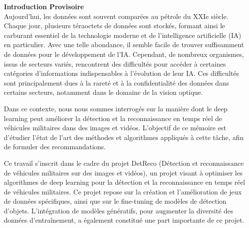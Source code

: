 \sloppy

\textbf{Introduction Provisoire}\\

Aujourd'hui, les données sont souvent comparées au pétrole du XXIe siècle. 
Chaque jour, plusieurs téraoctets de données sont stockés, formant ainsi le carburant essentiel de la technologie moderne et de l'intelligence artificielle (IA) en particulier.
Avec une telle abondance, il semble facile de trouver suffisamment de données pour le développement de l'IA.
Cependant, de nombreux organismes, issus de secteurs variés, rencontrent des difficultés pour accéder à certaines catégories d’informations indispensables à l'évolution de leur IA.
Ces difficultés sont principalement dues à la rareté et à la confidentialité des données dans certains secteurs, notamment dans le domaine de la vision optique.

Dans ce contexte, nous nous sommes interrogés sur la manière dont le deep learning peut améliorer la détection et la reconnaissance en temps réel de véhicules militaires dans des images et vidéos.
L'objectif de ce mémoire est d'étudier l'état de l'art des méthodes et algorithmes appliqués à cette tâche, afin de formuler des recommandations.

Ce travail s'inscrit dans le cadre du projet DetReco (Détection et reconnaissance de véhicules militaires sur des images et vidéos), un projet visant à optimiser les algorithmes de deep learning pour la détection et la reconnaissance en temps réel de véhicules militaires.
Ce projet repose sur la création et l'amélioration de jeux de données spécifiques, ainsi que sur le fine-tuning de modèles de détection d'objets. L'intégration de modèles génératifs, pour augmenter la diversité des données d'entraînement, a également constitué une part importante de ce projet.